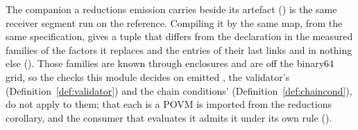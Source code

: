 
The companion a reductions emission carries beside its artefact
() is the same receiver segment run
on the reference. Compiling it by the same map, from the same specification,
gives a tuple that differs from the declaration in the measured families of
the factors it replaces and the entries of their last links and in nothing
else (). Those families are known
through enclosures and are off the binary64 grid, so the checks this module
decides on emitted , the validator's
(Definition~\ref{def:validator}) and the chain conditions'
(Definition~\ref{def:chaincond}), do not apply to them; that each is a POVM
is imported from the reductions corollary, and the consumer that evaluates it
admits it under its own rule ().

